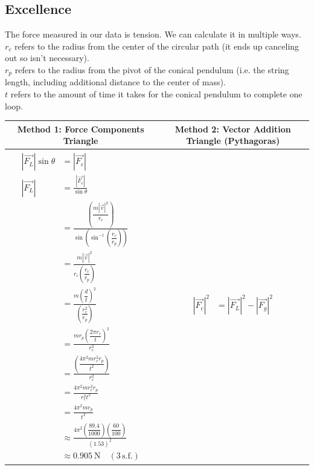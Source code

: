 \documentclass[11pt, a4paper]{article}
\begin{document}
	\subsection{Excellence}
	The force measured in our data is tension. We can calculate it in multiple ways.\\[\baselineskip]
	$r_c$ refers to the radius from the center of the circular path (it ends up canceling out so isn't necessary).\\
	$r_p$ refers to the radius from the pivot of the conical pendulum (i.e. the string length, including additional distance to the center of mass).\\
	$t$ refers to the amount of time it takes for the conical pendulum to complete one loop.
	
	\begin{table}[H]
		\begin{tabularx}{\textwidth}{c|c}
			Method 1: Force Components Triangle
			&
			Method 2: Vector Addition Triangle (Pythagoras)\\
			\hline
			\parbox{0.4\textwidth}{
			\begin{align}
				|\vec{F_L}|\sin \theta &= |\vec{F_c}|\\
				|\vec{F_L}|&=\frac{|\vec{F_c}|}{\sin \theta}\\
				&=\frac{\left(\dfrac{m|\vec{v}|^2}{r_c}\right)}{\sin \left(\sin^{-1}\left(\dfrac{r_c}{r_p}\right)\right)}\\
				&=\frac{m|\vec{v}|^2}{r_c\left(\dfrac{r_c}{r_p}\right)}\\
				&=\frac{m\left(\dfrac{d}{t}\right)^2}{\left(\dfrac{r_c^2}{r_p}\right)}\\
				&=\frac{mr_p\left(\dfrac{2\pi r_c}{t}\right)^2}{r_c^2}\\
				&=\frac{\left(\dfrac{4\pi^2mr_c^2r_p}{t^2}\right)}{r_c^2}\\
				&=\frac{4\pi^2mr_c^2r_p}{r_c^2t^2}\\
				&=\frac{4\pi^2mr_p}{t^2}\\
				&\approx\frac{4\pi^2\left(\dfrac{89.4}{1000}\right)\left(\dfrac{60}{100}\right)}{(1.53)^2}\\
				&\approx\SI{0.905}{\newton} \quad (3\, \text{s.f.})
			\end{align}
			}
			&
			\parbox{0.55\textwidth}{
			\begin{align}
				|\vec{F_c}|^2&=|\vec{F_L}|^2-|\vec{F_g}|^2\\

\end{align}}
\end{tabularx}
\end{table}
\end{document}
